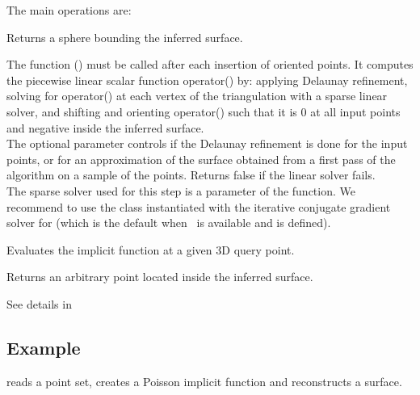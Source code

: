 The main operations are:

{
Returns a sphere bounding the inferred surface.
}

{
The function () must be called after each insertion of oriented points. It computes the piecewise linear scalar function operator() by: applying Delaunay refinement, solving for operator() at each vertex of the triangulation with a sparse linear solver, and shifting and orienting operator() such that it is 0 at all input points and negative inside the inferred surface.  \\
The optional parameter  controls if the Delaunay refinement is done for the input points, or for an approximation of the surface obtained from a first pass of the algorithm on a sample of the points.
Returns false if the linear solver fails.\\
The sparse solver used for this step is a parameter of the function. We recommend to use the class 
instantiated with the iterative conjugate gradient solver  for  (which is the default when \ccThirdPartyEigen\ is available and  is defined).
}

{
Evaluates the implicit function at a given 3D query point.
}

{
Returns an arbitrary point located inside the inferred surface.
}

See details in \\


\subsection{Example}

 reads a point set, creates a Poisson implicit function and reconstructs a surface.



